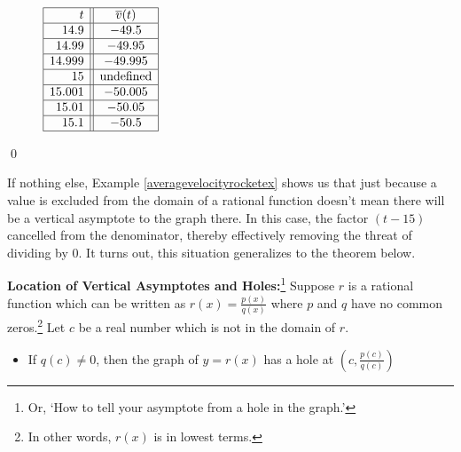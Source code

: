\begin{ex}
\begin{ex}
\begin{enumerate}
\begin{figure}
\begin{minipage}[b]{0.5\textwidth}
\begin{center}
$\begin{array}{|r||c|}  \hline
  t & \overline{v}(t)  \\ \hline
 14.9 & -49.5  \\  \hline
14.99 & -49.95  \\  \hline 
14.999 & -49.995  \\  \hline 
15 & \text{undefined} \\  \hline 
15.001 & -50.005 \\  \hline
15.01 & -50.05 \\  \hline  
15.1 & -50.5 \\  \hline 
  \end{array} $ 

\label{tab:velocitydata}
\end{center}
\end{minipage}

\end{figure}

\end{enumerate}

\qed

\end{ex} 

If nothing else, Example \ref{averagevelocityrocketex} shows us that just because a value is excluded from the domain of a rational function doesn't mean there will be a vertical asymptote to the graph there.  In this case, the factor $(t-15)$ cancelled from the denominator, thereby effectively removing the threat of dividing by $0$. It turns out, this situation generalizes to the theorem below. 
 
\begin{tcolorbox}
\begin{thm}  \textbf{Location of Vertical Asymptotes and Holes:}\footnote{Or, `How to tell your asymptote from a hole in the graph.'}  \label{vavshole}  Suppose $r$ is a rational function which can be written as $r(x) = \frac{p(x)}{q(x)}$ where $p$ and $q$ have no common zeros.\footnote{In other words, $r(x)$ is in lowest terms.}  Let $c$ be a real number which is not in the domain of $r$.   

\begin{itemize}

\item  If $q(c) \neq 0$, then the graph of $y=r(x)$ has a hole at $\left(c, \frac{p(c)}{q(c)}\right)$


\end{itemize}
\end{thm}
\end{tcolorbox}
\end{ex}
